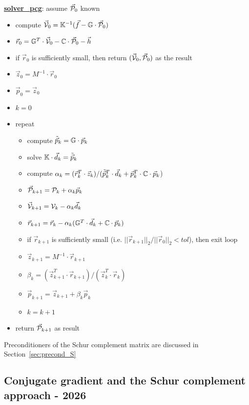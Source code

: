 \newpage
\begin{mdframed}[backgroundcolor=blue!5]
\underline{\bf solver\_pcg}: assume $\vec{\cal P}_0$ known
\begin{itemize}
\item compute $\vec{\cal V}_0={\mathbb{K}}^{-1}(\vec{f}-{\mathbb{G}}\cdot \vec{\cal P}_0)$
\item $\vec{r}_0 = {\mathbb{G}}^T \cdot \vec{\cal V}_0 - {\mathbb{C}} \cdot \vec{\cal P}_0 - \vec{h}$
\item if $\vec{r}_0$ is sufficiently small, then return $(\vec{\cal V}_0,\vec{\cal P}_0)$ as the result
\item $\vec{z}_0= M^{-1} \cdot \vec{r}_0$ 
\item $\vec{p}_0=\vec{z}_0$
\item $k=0$
\item repeat
\begin{itemize}
\item compute $\tilde{\vec{p}}_k = {\mathbb{G}} \cdot \vec{p}_k$
\item solve ${\mathbb{K}}\cdot  \vec{d}_k = \tilde{\vec{p}}_k$
\item compute $\alpha_k=(\vec{r}_k^T \cdot \vec{z}_k)/(\tilde{\vec{p}}_k^T \cdot \vec{d}_k
      + \vec{p}_k^T\cdot{\mathbb{C}} \cdot \vec{p}_k$)
\item $\vec{\cal P}_{k+1} = {\cal P}_k+\alpha_k \vec{p}_k$
\item $\vec{\cal V}_{k+1} = {\cal V}_k - \alpha_k \vec{d}_k$
\item $\vec{r}_{k+1} = \vec{r}_k - \alpha_k ({\mathbb{G}}^T \cdot \vec{d}_k + {\mathbb{C}} \cdot \vec{p}_k) $
\item if $\vec{r}_{k+1}$ is sufficiently small (i.e. $||\vec{r}_{k+1}||_2/||\vec{r}_0||_2 <tol$), 
      then exit loop
\item $\vec{z}_{k+1}=M^{-1} \cdot \vec{r}_{k+1}$
\item $\beta_k=(\vec{z}_{k+1}^T \cdot  \vec{r}_{k+1})/(\vec{z}_k^T \cdot  \vec{r}_k)$
\item $\vec{p}_{k+1} =\vec{z}_{k+1}+ \beta_k \vec{p}_k$
\item $k=k+1$
\end{itemize}
\item return $\vec{\cal P}_{k+1}$ as result
\end{itemize}
\end{mdframed}

Preconditioners of the Schur complement matrix are discussed in Section~\ref{sec:precond_S}


\newpage
\subsection{Conjugate gradient and the Schur complement approach - 2026 \cite{jalt26}}
\label{ss:schurpcg2}



